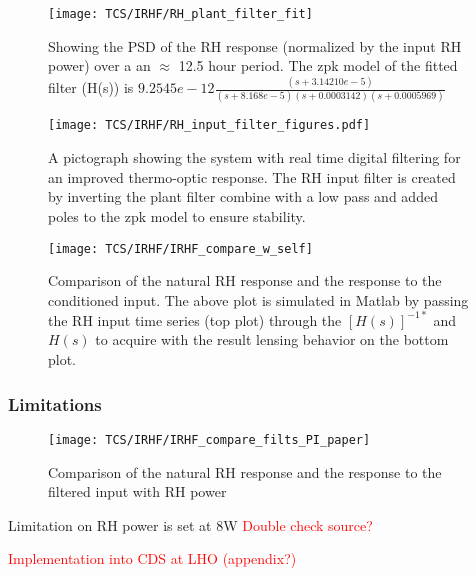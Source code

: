 \begin{figure}[H]
\texttt{[image: TCS/IRHF/RH\_plant\_filter\_fit]}
\caption{Showing the PSD of the RH response (normalized by the input RH power) over a an $\approx$ 12.5 hour period. The zpk model of the fitted filter (H(s)) is $9.2545e-12 \frac{(s+3.14210e-5)}{(s+8.168e-5)(s+0.0003142)(s+0.0005969)}$}
\label{fig:plant_v_fit}
\end{figure}

\begin{figure}[H]
\centering
\texttt{[image: TCS/IRHF/RH\_input\_filter\_figures.pdf]}
\caption{A pictograph showing the system with real time digital filtering for an improved thermo-optic response. The RH input filter is created by inverting the plant filter combine with a low pass and added poles to the zpk model to ensure stability.}
\label{fig:rtdf_pictograph}
\end{figure}

\begin{figure}[H]
\texttt{[image: TCS/IRHF/IRHF\_compare\_w\_self]}
\caption{Comparison of the natural RH response and the response to the conditioned input. The above plot is simulated in Matlab by passing the RH input time series (top plot) through the $[H(s)]^{-1*}$ and $H(s)$ to acquire with the result lensing behavior on the bottom plot.}
\label{fig:dynam_comparison}
\end{figure}
\newpage

\subsubsection{Limitations}
\begin{figure}[H]
\texttt{[image: TCS/IRHF/IRHF\_compare\_filts\_PI\_paper]}
\caption{Comparison of the natural RH response and the response to the filtered input with RH power}
\label{fig:RH_power}
\end{figure}
Limitation on RH power is set at 8W \textcolor{red}{Double check source?}

\textcolor{red}{Implementation into CDS at LHO (appendix?)}


